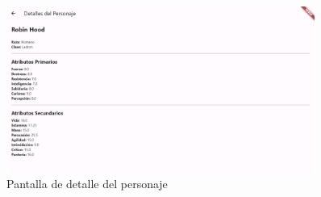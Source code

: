 \documentclass{article}
\begin{document}
\begin{figure}[h]
    \centering
    \vspace{5pt}
    \includegraphics[width=0.9\textwidth]{Ejecucion_3.png}
    \caption{Pantalla de detalle del personaje}
    \label{fig:ejecucion_2}
\end{figure}
\end{document}
